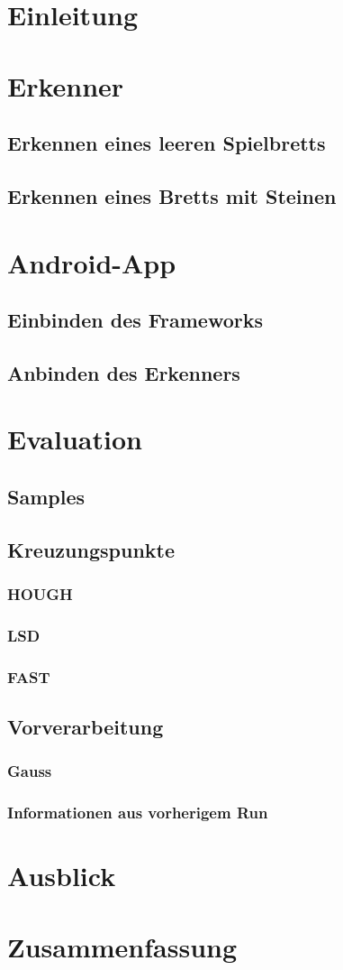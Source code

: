 \chapter{Einleitung}
\chapter{Erkenner}
	\section{Erkennen eines leeren Spielbretts}
	\section{Erkennen eines Bretts mit Steinen}
\chapter{Android-App}
	\section{Einbinden des Frameworks}
	\section{Anbinden des Erkenners}
\chapter{Evaluation}
	\section{Samples}
	\section{Kreuzungspunkte}
		\subsection{HOUGH}
		\subsection{LSD}
		\subsection{FAST}
	\section{Vorverarbeitung}
		\subsection{Gauss}
		\subsection{Informationen aus vorherigem Run}
\chapter{Ausblick}
\chapter{Zusammenfassung}
